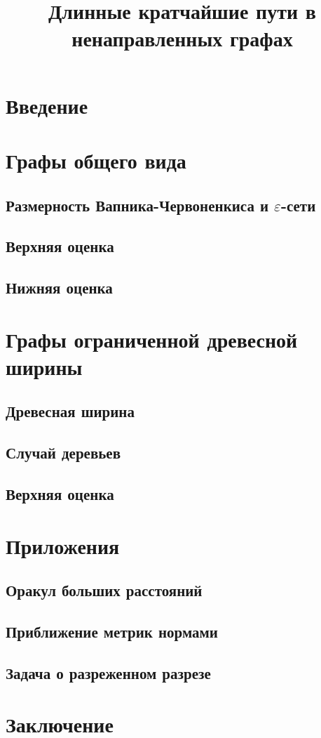 \documentclass{article}
\title{Длинные кратчайшие пути в ненаправленных графах}
\newcommand{\eps}{\varepsilon}
\begin{document}
    \maketitle
    \section{Введение}
    \section{Графы общего вида}
    \subsection{Размерность Вапника-Червоненкиса и $\eps$-сети}
    \subsection{Верхняя оценка}
    \subsection{Нижняя оценка}
    \cite{A10}
    \section{Графы ограниченной древесной ширины}
    \subsection{Древесная ширина}
    \subsection{Случай деревьев}
    \subsection{Верхняя оценка}
    \section{Приложения}
    \subsection{Оракул больших расстояний}
    \subsection{Приближение метрик нормами}
    \subsection{Задача о разреженном разрезе}
    \section{Заключение}
    
    
\end{document}
